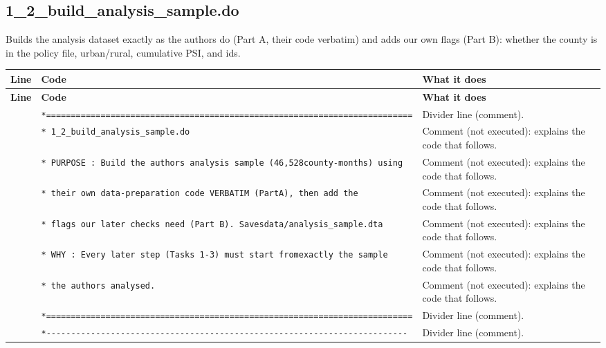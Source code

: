 \documentclass[10pt]{article}
\newcommand{\codetable}[1]{%
{\footnotesize
\begin{longtable}{>{\raggedleft\arraybackslash}p{0.55cm}>{\raggedright\arraybackslash}p{8.3cm}>{\raggedright\arraybackslash}p{8.0cm}}
\toprule \textbf{Line} & \textbf{Code} & \textbf{What it does}\\ \midrule \endfirsthead
\toprule \textbf{Line} & \textbf{Code} & \textbf{What it does}\\ \midrule \endhead
\bottomrule \endfoot
#1
\end{longtable}}}
\begin{document}
\subsection{1\_2\_build\_analysis\_sample.do}
Builds the analysis dataset exactly as the authors do (Part A, their code verbatim) and adds our own flags (Part B): whether the county is in the policy file, urban/rural, cumulative PSI, and ids.

\codetable{1 & \texttt{*=========================================================\newline \hspace*{1em}=================} & Divider line (comment).\\
2 & \texttt{* 1\_2\_build\_analysis\_sample.do} & Comment (not executed): explains the code that follows.\\
3 & \texttt{* PURPOSE : Build the authors\textquotesingle{} analysis sample (46,528\newline \hspace*{1em}county-{}months) using} & Comment (not executed): explains the code that follows.\\
4 & \texttt{*           their own data-{}preparation code VERBATIM (Part\newline \hspace*{1em}A), then add the} & Comment (not executed): explains the code that follows.\\
5 & \texttt{*           flags our later checks need (Part B). Saves\newline \hspace*{1em}data/analysis\_sample.dta} & Comment (not executed): explains the code that follows.\\
6 & \texttt{* WHY     : Every later step (Tasks 1-{}3) must start from\newline \hspace*{1em}exactly the sample} & Comment (not executed): explains the code that follows.\\
7 & \texttt{*           the authors analysed.} & Comment (not executed): explains the code that follows.\\
8 & \texttt{*=========================================================\newline \hspace*{1em}=================} & Divider line (comment).\\
10 & \texttt{*-{}-{}-{}-{}-{}-{}-{}-{}-{}-{}-{}-{}-{}-{}-{}-{}-{}-{}-{}-{}-{}-{}-{}-{}-{}-{}-{}-{}-{}-{}-{}-{}-{}-{}-{}-{}-{}-{}-{}-{}-{}-{}-{}-{}-{}-{}-{}-{}-{}-{}-{}-{}-{}-{}-{}-{}-{}\newline \hspace*{1em}-{}-{}-{}-{}-{}-{}-{}-{}-{}-{}-{}-{}-{}-{}-{}-{}} & Divider line (comment).\\
}
\end{document}
